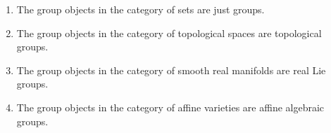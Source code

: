 \begin{example}
  \leavevmode
  \begin{enumerate}
    \item
      The group objects in the category of sets are just groups.
    \item
      The group objects in the category of topological spaces are topological groups.
    \item
      The group objects in the category of smooth real manifolds are real Lie groups.
    \item
      The group objects in the category of affine varieties are affine algebraic groups.
  \end{enumerate}
\end{example}














